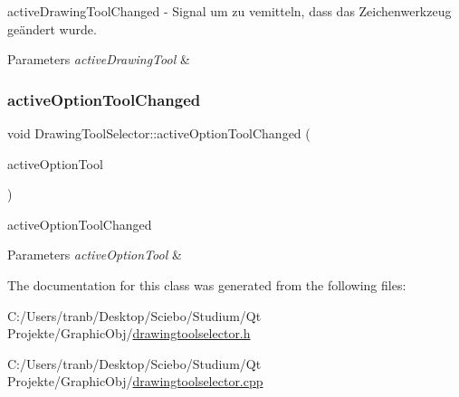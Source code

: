 active\+Drawing\+Tool\+Changed -\/ Signal um zu vemitteln, dass das Zeichenwerkzeug geändert wurde. 


\begin{DoxyParams}{Parameters}
{\em active\+Drawing\+Tool} & \\
\hline
\end{DoxyParams}
\mbox{\label{class_drawing_tool_selector_a062791d4a8183a6f20ecd12975ddc72d}} 
\subsubsection{\texorpdfstring{active\+Option\+Tool\+Changed}{activeOptionToolChanged}}
{\footnotesize\ttfamily void Drawing\+Tool\+Selector\+::active\+Option\+Tool\+Changed (\begin{DoxyParamCaption}\item[{\hyperlink{class_tools_a4b55b2ca4eef4d80ae1042233832bb8b}{Tools\+::\+Option\+Tool}}]{active\+Option\+Tool }\end{DoxyParamCaption})\hspace{0.3cm}{\ttfamily [signal]}}



active\+Option\+Tool\+Changed 


\begin{DoxyParams}{Parameters}
{\em active\+Option\+Tool} & \\
\hline
\end{DoxyParams}


The documentation for this class was generated from the following files\+:\begin{DoxyCompactItemize}
\item 
C\+:/\+Users/tranb/\+Desktop/\+Sciebo/\+Studium/\+Qt Projekte/\+Graphic\+Obj/\hyperlink{drawingtoolselector_8h}{drawingtoolselector.\+h}\item 
C\+:/\+Users/tranb/\+Desktop/\+Sciebo/\+Studium/\+Qt Projekte/\+Graphic\+Obj/\hyperlink{drawingtoolselector_8cpp}{drawingtoolselector.\+cpp}\end{DoxyCompactItemize}
